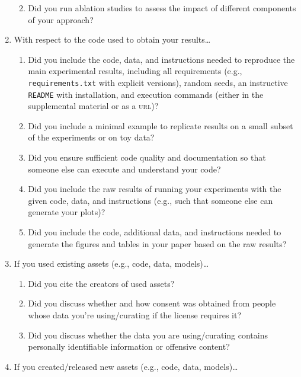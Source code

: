 \documentclass[11pt]{article}
\begin{document}
\begin{enumerate}
\begin{enumerate}
    \answerTODO{}
  \item Did you run ablation studies to assess the impact of different
    components of your approach?
    \answerTODO{}
  \end{enumerate}
\item With respect to the code used to obtain your results\dots
  \begin{enumerate}
\item Did you include the code, data, and instructions needed to reproduce the
    main experimental results, including all requirements (e.g.,
    \texttt{requirements.txt} with explicit versions), random seeds, an instructive
    \texttt{README} with installation, and execution commands (either in the
    supplemental material or as a \textsc{url})?
    \answerTODO{}
  \item Did you include a minimal example to replicate results on a small subset
    of the experiments or on toy data?
    \answerTODO{}
  \item Did you ensure sufficient code quality and documentation so that someone else
    can execute and understand your code?
    \answerTODO{}
  \item Did you include the raw results of running your experiments with the given
    code, data, and instructions (e.g., such that someone else can generate your plots)?
    \answerTODO{}
  \item Did you include the code, additional data, and instructions needed to generate
    the figures and tables in your paper based on the raw results?
    \answerTODO{}
  \end{enumerate}
\item If you used existing assets (e.g., code, data, models)\dots
  \begin{enumerate}
  \item Did you cite the creators of used assets?
    \answerTODO{}
  \item Did you discuss whether and how consent was obtained from people whose
    data you're using/curating if the license requires it?
    \answerTODO{}
  \item Did you discuss whether the data you are using/curating contains
    personally identifiable information or offensive content?
    \answerTODO{}
  \end{enumerate}
\item If you created/released new assets (e.g., code, data, models)\dots

\end{enumerate}
\end{document}
